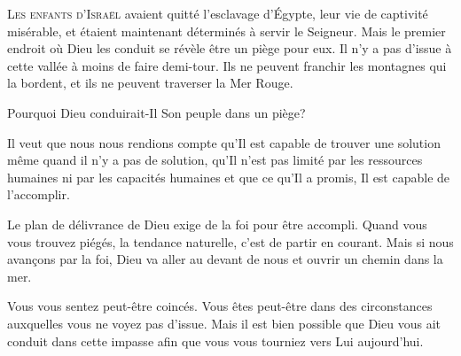 



\lettrine{L}{es enfants d'Israël} avaient quitté l'esclavage d'Égypte,
 leur vie de captivité misérable,
 et étaient maintenant déterminés à servir le Seigneur.
 Mais le premier endroit où Dieu les conduit se révèle être un piège pour eux.
 Il n'y a pas d'issue à cette vallée à moins de faire demi-tour.
 Ils ne peuvent franchir les montagnes qui la bordent,
 et ils ne peuvent traverser la Mer Rouge.

Pourquoi Dieu conduirait-Il Son peuple dans un piège?


Il veut que nous nous rendions compte qu'Il est capable de trouver une solution
 même quand il n'y a pas de solution,
 qu'Il n'est pas limité par les ressources humaines
 ni par les capacités humaines et que ce qu'Il a promis,
 Il est capable de l'accomplir.

Le plan de délivrance de Dieu exige de la foi pour être accompli.
 Quand vous vous trouvez piégés, la tendance naturelle,
 c'est de partir en courant.
 Mais si nous avan\c{c}ons par la foi,
 Dieu va aller au devant de nous et ouvrir un chemin dans la mer.

Vous vous sentez peut-être coincés.
 Vous êtes peut-être dans des circonstances
 auxquelles vous ne voyez pas d'issue.
 Mais il est bien possible que Dieu vous ait conduit dans cette impasse
 afin que vous vous tourniez vers Lui aujourd'hui. 

\dvrule




